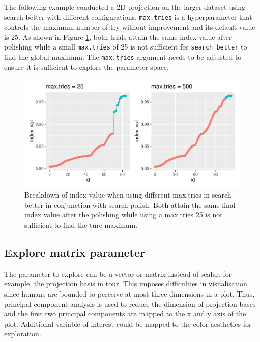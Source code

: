 \documentclass[12pt]{article}
\begin{document}
The following example conducted a 2D projection on the larger dataset
using search better with different configurations. \texttt{max.tries} is
a hyperparameter that controls the maximum number of try without
improvement and its default value is 25. As shown in Figure
\ref{trace-compare}, both trials attain the same index value after
polishing while a small \texttt{max.tries} of 25 is not sufficient for
\texttt{search\_better} to find the global maximum. The
\texttt{max.tries} argument needs to be adjusted to ensure it is
sufficient to explore the parameter space.

\begin{figure}
\centering
\includegraphics{paper_files/figure-latex/polish-1.pdf}
\caption{\label{trace-compare}Breakdown of index value when using
different max.tries in search better in conjunction with search polish.
Both attain the same final index value after the polishing while using a
max.tries 25 is not sufficient to find the ture maximum.}
\end{figure}

\hypertarget{explore-matrix-parameter}{%
\subsection{Explore matrix parameter}\label{explore-matrix-parameter}}

The parameter to explore can be a vector or matrix instead of scalar,
for example, the projection basis in tour. This imposes difficulties in
visualisation since humans are bounded to perceive at most three
dimensions in a plot. Thus, principal component analysis is used to
reduce the dimension of projection bases and the first two principal
components are mapped to the x and y axis of the plot. Additional
variable of interest could be mapped to the color aesthetics for
exploration.
\end{document}
